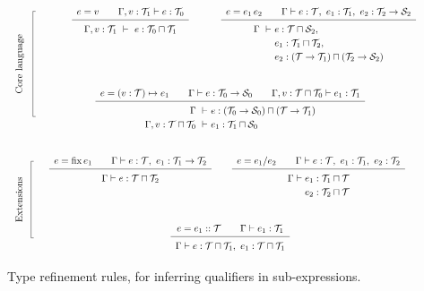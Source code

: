 \begin{figure*}
\newcommand\typerule[2]{{\renewcommand\arraystretch{1.5}\begin{array}[t]{c} #1 \\ \hline #2 \end{array}}}
\[
\renewcommand\arraystretch{4}
\begin{array}{cccp{1cm}}
  \multirow{2}{1cm}[-3em]{\begin{tikzpicture}\draw (1mm,6em) -- (0,6em) -- (0,-5em) node[midway,above,xshift=-2mm,rotate=90] {Core language} -- +(1mm,0);\end{tikzpicture}} &
  \typerule{e=v \qquad \Gamma,v:\T_1\vdash e:\T_0}
           {\Gamma,v:\T_1 ~\vdash~ e:\T_0\sqcap\T_1} &
  \typerule{e=e_1\,e_2 \qquad \Gamma \vdash e:\T, ~ e_1:\T_1, ~ e_2:\T_2\to\S_2}
           {\renewcommand\arraystretch{1.2}
            \begin{array}[t]{@{}l@{}l@{}}
              \Gamma ~\vdash~ & e:\T\sqcap\S_2, \\ 
                              & e_1:\T_1\sqcap\T_2, \\
                              & e_2:(\T\to\T_1)\sqcap(\T_2\to\S_2)
            \end{array}} & \\
  &
  \cspan2{
  \typerule{e=(v:\T)\mapsto e_1 \qquad \Gamma\vdash e:\T_0\to\S_0 \qquad \Gamma,v:\T\sqcap\T_0\vdash e_1:\T_1}
           {\renewcommand\arraystretch{1.2}
            \begin{array}[t]{r@{}l}
              \Gamma ~\vdash~ & e:(\T_0\to\S_0)\sqcap(\T\to\T_1)\\
              \Gamma,v:\T\sqcap\T_0 ~\vdash~ & e_1:\T_1\sqcap\S_0 
            \end{array}}  } & \\
  \multirow{2}{1cm}[-2.5em]{\begin{tikzpicture}\draw (1mm,0) -- (0,0) -- (0,-8em) node[midway,above,xshift=-2mm,rotate=90] {Extensions} -- +(1mm,0);\end{tikzpicture}} &
  \typerule{e=\fix e_1 \qquad \Gamma\vdash e:\T, ~ e_1:\T_1\to\T_2}          %
           {\Gamma\vdash e: \T\sqcap\T_2} &
  \typerule{e=e_1/e_2 \qquad \Gamma\vdash e:\T, ~ e_1:\T_1, ~ e_2:\T_2}      %
           {\renewcommand\arraystretch{1.2}
            \begin{array}[t]{@{}l@{}l@{}}
              \Gamma\vdash{} & e_1:\T_1\sqcap\T \\ & 
                               e_2:\T_2\sqcap\T
            \end{array}} & \\
  &
  \cspan2{
  \typerule{e=e_1::\T \qquad \Gamma\vdash e_1:\T_1}                           %
           {\Gamma\vdash e:\T\sqcap\T_1, ~ e_1:\T\sqcap\T_1} } &
\end{array}
\]
\caption{\label{lang:type refinement rules}
  Type refinement rules, for inferring qualifiers in sub-expressions.}
\end{figure*}

